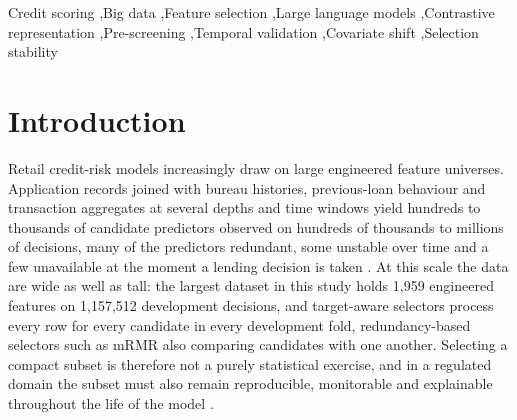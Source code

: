 \documentclass[final,5p,twocolumn]{elsarticle}
\begin{document}
\begin{frontmatter}
\begin{abstract}
pre-screening, by a language model or a contrastive representation, is therefore a usable first-pass filter for big-data credit scoring whose benefit depends on the dataset and the downstream model, and which should be governed jointly with stability and drift monitoring.
\end{abstract}

\begin{keyword}
Credit scoring \sep Big data \sep Feature selection \sep Large language models \sep Contrastive representation \sep Pre-screening \sep Temporal validation \sep Covariate shift \sep Selection stability
\end{keyword}

\end{frontmatter}


\section{Introduction}
\label{sec:introduction}

Retail credit-risk models increasingly draw on large engineered feature universes. Application records joined with bureau histories, previous-loan behaviour and transaction aggregates at several depths and time windows yield hundreds to thousands of candidate predictors observed on hundreds of thousands to millions of decisions, many of the predictors redundant, some unstable over time and a few unavailable at the moment a lending decision is taken \cite{thomas2002,siddiqi2006}. At this scale the data are wide as well as tall: the largest dataset in this study holds 1,959 engineered features on 1,157,512 development decisions, and target-aware selectors process every row for every candidate in every development fold, redundancy-based selectors such as mRMR also comparing candidates with one another. Selecting a compact subset is therefore not a purely statistical exercise, and in a regulated domain the subset must also remain reproducible, monitorable and explainable throughout the life of the model \cite{lessmann2015,gunnarsson2021,ballegeer2025}.
\end{document}
